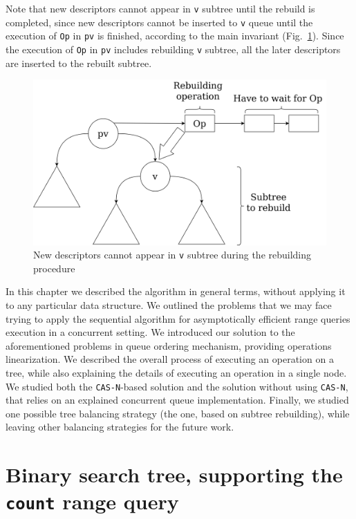 \documentclass[times, dvipsnames,%
               languages={russian,english} %
              ]{itmo-student-thesis}
\begin{document}
Note that new descriptors cannot appear in \texttt{v} subtree  until the rebuild is completed, since new descriptors cannot be inserted to \texttt{v} queue until the execution of \texttt{Op} in \texttt{pv} is finished, according to the main invariant (Fig.~\ref{rebuild-wait-pic}). Since the execution of \texttt{Op} in \texttt{pv} includes rebuilding \texttt{v} subtree, all the later descriptors are inserted to the rebuilt subtree.

\begin{figure}[H]
  \centering
  \caption{New descriptors cannot appear in \texttt{v} subtree during the rebuilding procedure}
  \label{rebuild-wait-pic}
  \includegraphics[width=\linewidth]{pics/rebuild-wait.png}
\end{figure}

\chapterconclusion

In this chapter we described the algorithm in general terms, without applying it to any particular data structure. We outlined the problems that we may face trying to apply the sequential algorithm for asymptotically efficient range queries execution in a concurrent setting. We introduced our solution to the aforementioned problems in queue ordering mechanism, providing operations linearization. We described the overall process of executing an operation on a tree, while also explaining the details of executing an operation in a single node. We studied both the \texttt{CAS-N}-based solution and the solution without using \texttt{CAS-N}, that relies on an explained concurrent queue implementation. Finally, we studied one possible tree balancing strategy (the one, based on subtree rebuilding), while leaving other balancing strategies for the future work.

\chapter{Binary search tree, supporting the \texttt{count} range query}
\label{tree-chapter}
\end{document}
